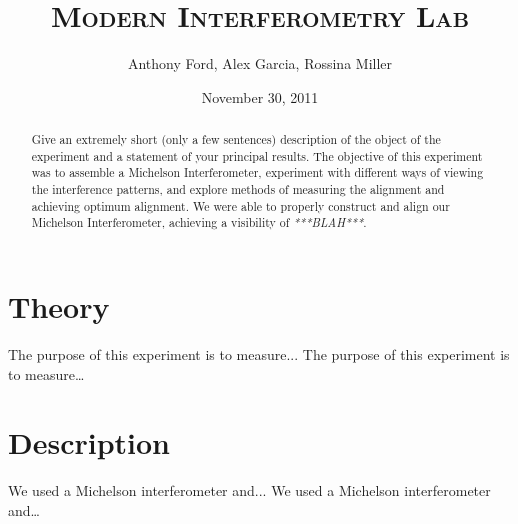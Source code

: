 \documentclass[12pt,titlepage,final]{article}
\begin{document}
\title{\textsc{Modern Interferometry Lab}}
\author{Anthony Ford, Alex Garcia, Rossina Miller}
\date{November 30, 2011}
\maketitle

\clearpage

\begin{abstract}
Give an extremely short (only a few sentences) description of the object of the experiment and a statement of your principal results.
The objective of this experiment was to assemble a Michelson Interferometer,
experiment with different ways of viewing the interference patterns, and explore
methods of measuring the alignment and achieving optimum alignment. We were able
to properly construct and align our Michelson Interferometer, achieving a
visibility of \emph{***BLAH***}.
\end{abstract}



\section{Theory}

The purpose of this experiment is to measure...
The purpose of this experiment is to measure\ldots


\section{Description}

We used a Michelson interferometer and...
We used a Michelson interferometer and\ldots
\end{document}
